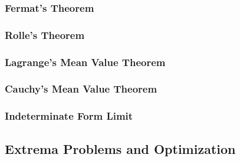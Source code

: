         \subsubsection{Fermat's Theorem}
        \subsubsection{Rolle's Theorem}
        \subsubsection{Lagrange's Mean Value Theorem}
        \subsubsection{Cauchy's Mean Value Theorem}
        \subsubsection{Indeterminate Form Limit}
        \subsection{Extrema Problems and Optimization}